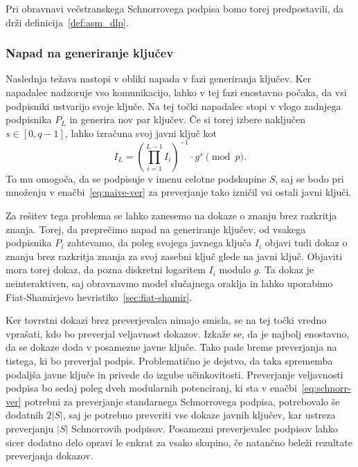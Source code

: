 \documentclass[isrm2, tisk]{fmfdelo}
\begin{document}
Pri obravnavi večstranskega Schnorrovega podpisa bomo torej predpostavili, da drži definicija~\ref{def:asm_dlp}.

\subsubsection{Napad na generiranje ključev}
Naslednja težava nastopi v obliki napada v fazi generiranja ključev. Ker napadalec nadzoruje vso
komunikacijo, lahko v tej fazi enostavno počaka, da vsi podpisniki ustvarijo svoje ključe. Na tej
točki napadalec stopi v vlogo zadnjega podpisnika $P_L$ in generira nov par ključev.
Če si torej izbere naključen $s \in [0, q- 1]$, lahko izračuna svoj javni ključ kot
$$
I_L = \left( \prod_{i=1}^{L-1} I_i \right)^{-1} \cdot g^s \pmod p.
$$
To mu omogoča, da se podpisuje v imenu celotne podskupine $S$, saj se bodo pri množenju v
enačbi~\ref{eq:naive-ver} za preverjanje tako izničil vsi ostali javni ključi.

Za rešitev tega problema se lahko zanesemo na dokaze o znanju brez razkritja znanja.
Torej, da preprečimo napad na generiranje ključev, od vsakega podpisnika $P_i$ zahtevamo, da poleg
svojega javnega ključa $I_i$ objavi tudi dokaz o znanju brez razkritja znanja za svoj zasebni ključ
glede na javni ključ. Objaviti mora torej dokaz, da pozna diskretni logaritem $I_i$ modulo $g$.
Ta dokaz je neinteraktiven, saj obravnavmo model slučajnega oraklja in lahko uporabimo Fiat-Shamirjevo
hevristiko~\ref{sec:fiat-shamir}.

Ker tovrstni dokazi brez preverjevalca nimajo smisla, se na tej točki vredno vprašati, kdo bo preverjal
veljavnost dokazov. Izkaže se, da je najbolj enostavno, da se dokaze doda v posamezne javne ključe.
Tako pade breme preverjanja na tistega, ki bo preverjal podpis. Problematično je dejstvo, da taka
sprememba podaljša javne ključe in privede do izgube učinkovitosti. Preverjanje veljavnosti podpisa 
bo sedaj poleg dveh modularnih potenciranj, ki sta v enačbi~\ref{eq:schnorr-ver} potrebni za
preverjanje standarnega Schnorrovega podpisa, potrebovalo še dodatnih $2|S|$, saj je potrebno
preveriti vse dokaze javnih ključev, kar ustreza preverjanju $|S|$ Schnorrovih podpisov. Posamezni
preverjevalec podpisov lahko sicer dodatno delo opravi le enkrat za vsako skupino, če natančno beleži
rezultate preverjanja dokazov.
\end{document}
